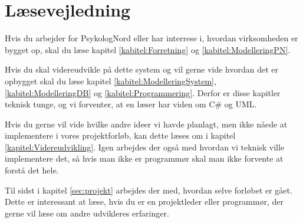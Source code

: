 \section{Læsevejledning}

Hvis du arbejder for PsykologNord eller har interrese i, hvordan virksomheden er bygget op, skal du læse kapitel \ref{kabitel:Forretning} og \ref{kabitel:ModelleringPN}.

Hvis du skal videreudvikle på dette system og vil gerne vide hvordan det er opbygget skal du læse kapitel \ref{kabitel:ModelleringSystem}, \ref{kabitel:ModelleringDB} og \ref{kabitel:Programmering}.
Derfor er disse kapitler teknisk tunge, og vi forventer, at en læser har viden om C\# og UML.

Hvis du gerne vil vide hvilke andre ideer vi havde planlagt, men ikke nåede at implementere i vores projektforløb, kan dette læses om i kapitel \ref{kapitel:Videreudvikling}.
Igen arbejdes der også med hvordan vi teknisk ville implementere det, så hvis man ikke er programmør skal man ikke forvente at forstå det hele.

Til sidst i kapitel \ref{sec:projekt} arbejdes der med, hvordan selve forløbet er gået.
Dette er interessant at læse, hvis du er en projektleder eller programmør, der gerne vil læse om andre udvikleres erfaringer.

\newpage